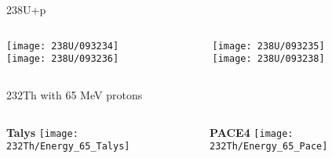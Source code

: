 \documentclass[10pt]{beamer}
\begin{document}
\begin{frame}{238U+p}
	\begin{columns}
		\begin{column}{0.5\textwidth}
			\begin{overlayarea}{\textwidth}{\textheight}
				\centering	    
			   	\vspace{-0.1\textheight}
			   	\texttt{[image: 238U/093234]}\\
				\vspace{-0.01\textheight}		
				\texttt{[image: 238U/093236]}
			\end{overlayarea}
		\end{column}
		\begin{column}{0.5\textwidth}
			\begin{overlayarea}{\textwidth}{\textheight}
				\centering	    
			   	\vspace{-0.1\textheight}
			   	\texttt{[image: 238U/093235]}\\
				\vspace{-0.01\textheight}				
				\texttt{[image: 238U/093238]}
			\end{overlayarea}
		\end{column}
	\end{columns}
\end{frame}

\begin{frame}{232Th with 65 MeV protons}
	\begin{columns}
		\begin{column}{0.5\textwidth}
			\begin{overlayarea}{\textwidth}{\textheight}
				\centering	    
			   	\vspace{0.05\textheight}
			   	\textbf{Talys}
			   	\texttt{[image: 232Th/Energy\_65\_Talys]}\\
			\end{overlayarea}
		\end{column}
		\begin{column}{0.5\textwidth}
			\begin{overlayarea}{\textwidth}{\textheight}
				\centering	    
			   	\vspace{0.05\textheight}
			   	\textbf{PACE4}
				\texttt{[image: 232Th/Energy\_65\_Pace]}
			\end{overlayarea}
		\end{column}
	\end{columns}
\end{frame}
\end{document}
